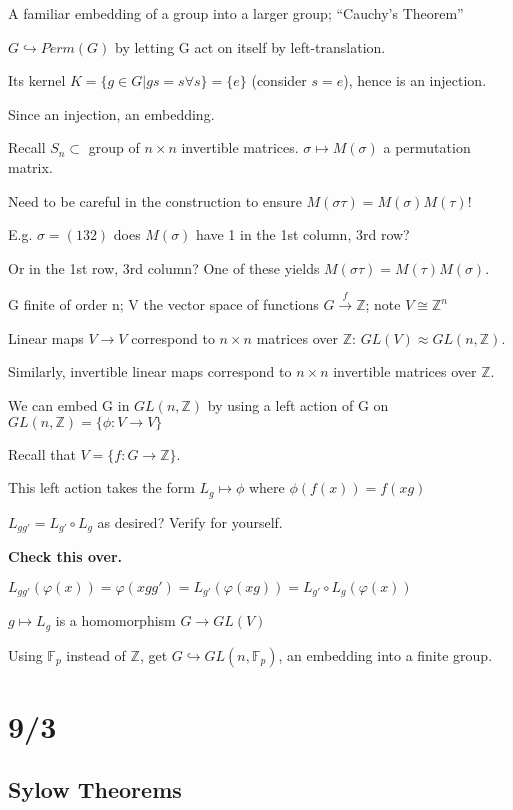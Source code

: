 \documentclass[12pt]{article}
\begin{document}
\noindent
A familiar embedding of a group into a larger group; ``Cauchy's Theorem''

$G \hookrightarrow Perm(G)$ by letting G act on itself by left-translation.

Its kernel $K = \{g \in G | gs=s \forall s\} = \{e\}$ (consider $s = e$), hence is an injection.

Since an injection, an embedding.

\noindent
Recall $S_n \subset$ group of $n \times n$ invertible matrices. $\sigma \mapsto M(\sigma)$ a permutation matrix.

Need to be careful in the construction to ensure $M(\sigma\tau)=M(\sigma)M(\tau)$!

E.g. $\sigma = (1 3 2)$ does $M(\sigma)$ have 1 in the 1st column, 3rd row?

Or in the 1st row, 3rd column?  One of these yields $M(\sigma\tau) = M(\tau)M(\sigma)$.

\noindent
G finite of order n; V the vector space of functions $G \xrightarrow{f} \mathds{Z}$; note $V \cong \mathds{Z}^n$

Linear maps $V \to V$ correspond to $n \times n$ matrices over $\mathds{Z}$:  $GL(V) \approx GL(n, \mathds{Z})$.

Similarly, invertible linear maps correspond to $n \times n$ invertible matrices over $\mathds{Z}$.

We can embed G in $GL(n, \mathds{Z})$ by using a left action of G on $GL(n, \mathds{Z}) = \{\phi: V \to V\}$

Recall that $V = \{f : G \to \mathds{Z}\}$.

This left action takes the form $L_g \mapsto \phi$ where $\phi(f(x)) = f(xg)$

$L_{gg'} = L_{g'} \circ L_{g}$ as desired? Verify for yourself.

\textbf{Check this over.}

$L_{gg'}(\varphi (x)) = \varphi(xgg') = L_{g'}(\varphi (xg)) = L_{g'} \circ L_g (\varphi(x))$

$g \mapsto L_g$ is a homomorphism $G \to GL(V)$

Using $\mathds{F}_p$ instead of $\mathds{Z}$, get $G \hookrightarrow GL(n, \mathds{F}_p)$, an embedding into a finite group.

\section{9/3}

\subsection{Sylow Theorems}
\end{document}
